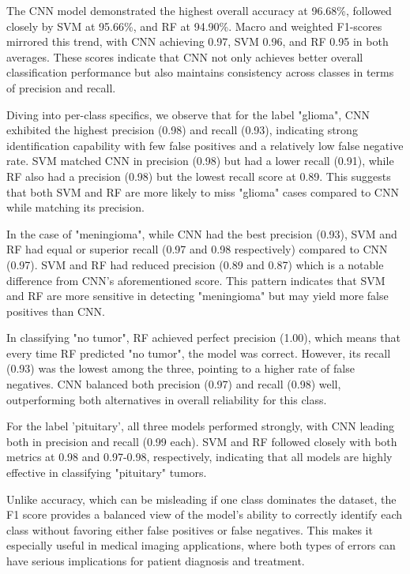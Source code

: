 \documentclass[conference]{IEEEtran}
\begin{document}
The CNN model demonstrated the highest overall accuracy at 96.68\%, followed closely by SVM at 95.66\%, and RF at 94.90\%. Macro and weighted F1-scores mirrored this trend, with CNN achieving 0.97, SVM 0.96, and RF 0.95 in both averages. These scores indicate that CNN not only achieves better overall classification performance but also maintains consistency across classes in terms of precision and recall.

Diving into per-class specifics, we observe that for the label "glioma", CNN exhibited the highest precision (0.98) and recall (0.93), indicating strong identification capability with few false positives and a relatively low false negative rate. SVM matched CNN in precision (0.98) but had a lower recall (0.91), while RF also had a precision (0.98) but the lowest recall score at 0.89. This suggests that both SVM and RF are more likely to miss "glioma" cases compared to CNN while matching its precision.

In the case of "meningioma", while CNN had the best precision (0.93), SVM and RF had equal or superior recall (0.97 and 0.98 respectively) compared to CNN (0.97). SVM and RF had reduced precision (0.89 and 0.87) which is a notable difference from CNN's aforementioned score. This pattern indicates that SVM and RF are more sensitive in detecting "meningioma" but may yield more false positives than CNN.

In classifying "no tumor", RF achieved perfect precision (1.00), which means that every time RF predicted "no tumor", the model was correct. However, its recall (0.93) was the lowest among the three, pointing to a higher rate of false negatives. CNN balanced both precision (0.97) and recall (0.98) well, outperforming both alternatives in overall reliability for this class.

For the label 'pituitary', all three models performed strongly, with CNN leading both in precision and recall (0.99 each). SVM and RF followed closely with both metrics at 0.98 and 0.97-0.98, respectively, indicating that all models are highly effective in classifying "pituitary" tumors.

Unlike accuracy, which can be misleading if one class dominates the dataset, the F1 score provides a balanced view of the model's ability to correctly identify each class without favoring either false positives or false negatives. This makes it especially useful in medical imaging applications, where both types of errors can have serious implications for patient diagnosis and treatment.
\end{document}
